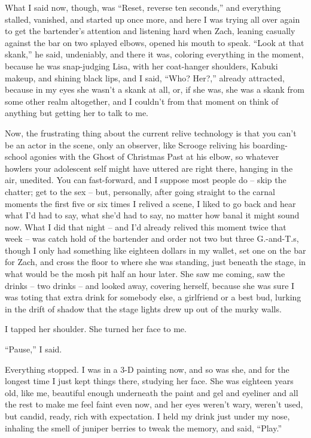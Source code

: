 \documentclass[11pt,a4paper]{article}
\newcommand{\qm}[1]{“#1”}
\begin{document}
What I said now, though, was \qm{Reset, reverse ten seconds,} and everything stalled, vanished, and started up once more, and here I was trying all over again to get the bartender's attention and listening hard when Zach, leaning casually against the bar on two splayed elbows, opened his mouth to speak. \qm{Look at that skank,} he said, undeniably, and there it was, coloring everything in the moment, because he was snap-judging Lisa, with her coat-hanger shoulders, Kabuki makeup, and shining black lips, and I said, \qm{Who? Her?,} already attracted, because in my eyes she wasn't a skank at all, or, if she was, she was a skank from some other realm altogether, and I couldn't from that moment on think of anything but getting her to talk to me.

Now, the frustrating thing about the current relive technology is that you can't be an actor in the scene, only an observer, like Scrooge reliving his boarding-school agonies with the Ghost of Christmas Past at his elbow, so whatever howlers your adolescent self might have uttered are right there, hanging in the air, unedited. You can fast-forward, and I suppose most people do – skip the chatter; get to the sex – but, personally, after going straight to the carnal moments the first five or six times I relived a scene, I liked to go back and hear what I'd had to say, what she'd had to say, no matter how banal it might sound now. What I did that night – and I'd already relived this moment twice that week – was catch hold of the bartender and order not two but three G.-and-T.s, though I only had something like eighteen dollars in my wallet, set one on the bar for Zach, and cross the floor to where she was standing, just beneath the stage, in what would be the mosh pit half an hour later. She saw me coming, saw the drinks – two drinks – and looked away, covering herself, because she was sure I was toting that extra drink for somebody else, a girlfriend or a best bud, lurking in the drift of shadow that the stage lights drew up out of the murky walls.

I tapped her shoulder. She turned her face to me.

\qm{Pause,} I said.

Everything stopped. I was in a 3-D painting now, and so was she, and for the longest time I just kept things there, studying her face. She was eighteen years old, like me, beautiful enough underneath the paint and gel and eyeliner and all the rest to make me feel faint even now, and her eyes weren't wary, weren't used, but candid, ready, rich with expectation. I held my drink just under my nose, inhaling the smell of juniper berries to tweak the memory, and said, \qm{Play.}
\end{document}
